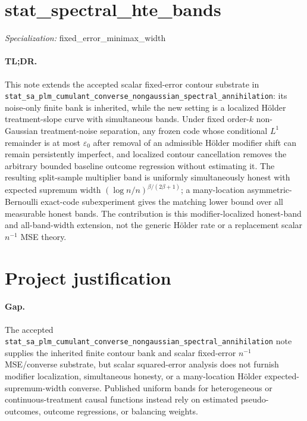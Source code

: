 \documentclass{article}
\begin{document}
\sloppy

\section*{stat\_\allowbreak{}spectral\_\allowbreak{}hte\_\allowbreak{}bands}

\noindent\textit{Specialization:} fixed\_\allowbreak{}error\_\allowbreak{}minimax\_\allowbreak{}width\par

\paragraph{TL;DR.} This note extends the accepted scalar fixed-error contour substrate in \texttt{stat\_sa\_plm\_cumulant\_converse\_nongaussian\_spectral\_annihilation}: its noise-only finite bank is inherited, while the new setting is a localized Hölder treatment-slope curve with simultaneous bands. Under fixed order-\(k\) non-Gaussian treatment-noise separation, any frozen code whose conditional \(L^1\) remainder is at most \(\varepsilon_0\) after removal of an admissible Hölder modifier shift can remain persistently imperfect, and localized contour cancellation removes the arbitrary bounded baseline outcome regression without estimating it. The resulting split-sample multiplier band is uniformly simultaneously honest with expected supremum width \((\log n/n)^{\beta/(2\beta+1)}\); a many-location asymmetric-Bernoulli exact-code subexperiment gives the matching lower bound over all measurable honest bands. The contribution is this modifier-localized honest-band and all-band-width extension, not the generic Hölder rate or a replacement scalar \(n^{-1}\) MSE theory.

\section{Project justification}

\paragraph{Gap.} The accepted \texttt{stat\_sa\_plm\_cumulant\_converse\_nongaussian\_spectral\_annihilation} note supplies the inherited finite contour bank and scalar fixed-error \(n^{-1}\) MSE/converse substrate, but scalar squared-error analysis does not furnish modifier localization, simultaneous honesty, or a many-location Hölder expected-supremum-width converse. Published uniform bands for heterogeneous or continuous-treatment causal functions instead rely on estimated pseudo-outcomes, outcome regressions, or balancing weights.
\end{document}

